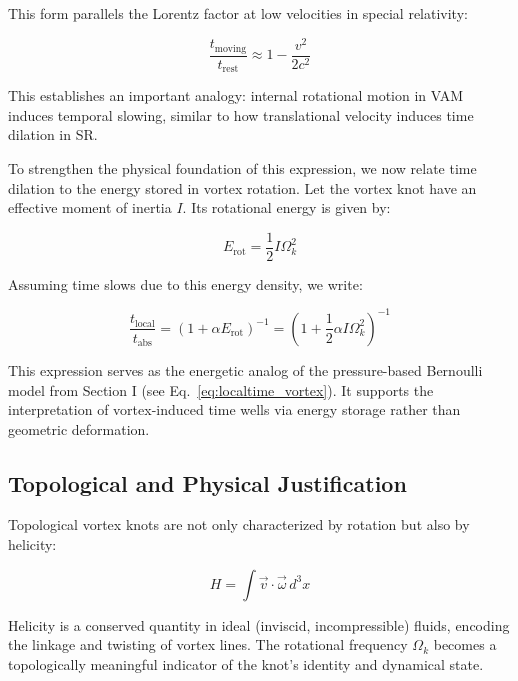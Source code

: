 This form parallels the Lorentz factor at low velocities in special relativity:

\begin{equation}
\frac{t_{\text{moving}}}{t_{\text{rest}}} \approx 1 - \frac{v^2}{2c^2}\label{eq:parallels_lorentz_time_dilation}
\end{equation}

This establishes an important analogy: internal rotational motion in VAM induces temporal slowing, similar to how translational velocity induces time dilation in SR.

To strengthen the physical foundation of this expression, we now relate time dilation to the energy stored in vortex rotation. Let the vortex knot have an effective moment of inertia $I$. Its rotational energy is given by:

\begin{equation}
E_{\text{rot}} = \frac{1}{2} I \Omega_k^2\label{eq:rotational_energy_inertia}
\end{equation}

Assuming time slows due to this energy density, we write:

\begin{equation}
\frac{t_{\text{local}}}{t_{\text{abs}}} = \left(1 + \alpha E_{\text{rot}} \right)^{-1} = \left(1 + \frac{1}{2} \alpha I \Omega_k^2 \right)^{-1}\label{eq:time_dilation_rotational_energy_inertia}
\end{equation}

This expression serves as the energetic analog of the pressure-based Bernoulli model from Section I (see Eq.~\eqref{eq:localtime_vortex}). It supports the interpretation of vortex-induced time wells via energy storage rather than geometric deformation.

\subsection{Topological and Physical Justification}

Topological vortex knots are not only characterized by rotation but also by helicity:

\begin{equation}
H = \int \vec{v} \cdot \vec{\omega} \, d^3x \label{eq:helicity_rotation}
\end{equation}

Helicity is a conserved quantity in ideal (inviscid, incompressible) fluids, encoding the linkage and twisting of vortex lines. The rotational frequency $\Omega_k$ becomes a topologically meaningful indicator of the knot’s identity and dynamical state.

